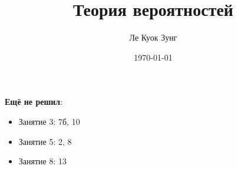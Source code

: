 \documentclass{article}
\title{Теория вероятностей}
\author{Ле Куок Зунг}
\date{\today}
\theoremstyle{definition}
\begin{document}
	\maketitle
	
	\newpage
	
	\newpage
	
	\newpage
	
	\newpage
	
	\newpage
	
	\newpage
	
	\newpage
	\textbf{Ещё не решил}:
	\begin{itemize}
		\item Занятие 3: 7б, 10
		\item Занятие 5: 2, 8
		\item Занятие 8: 13
	\end{itemize}
\end{document}
